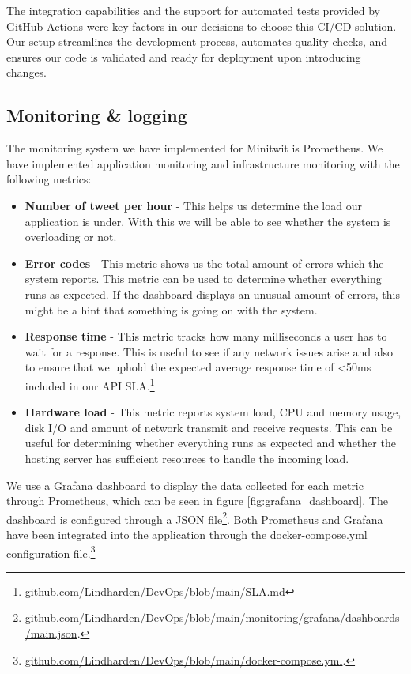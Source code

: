 The integration capabilities and the support for automated tests provided by GitHub Actions were key factors in our decisions to choose this CI/CD solution. Our setup streamlines the development process, automates quality checks, and ensures our code is validated and ready for deployment upon introducing changes.

\subsection{Monitoring \& logging}
The monitoring system we have implemented for Minitwit is Prometheus. We have implemented application monitoring and infrastructure monitoring with the following metrics:
\begin{itemize}
    \item \textbf{Number of tweet per hour} - This helps us determine the load our application is under. With this we will be able to see whether the system is overloading or not.
    \item \textbf{Error codes} - This metric shows us the total amount of errors which the system reports. This metric can be used to determine whether everything runs as expected. If the dashboard displays an unusual amount of errors, this might be a hint that something is going on with the system.
    \item \textbf{Response time} - This metric tracks how many milliseconds a user has to wait for a response. This is useful to see if any network issues arise and also to ensure that we uphold the expected average response time of <50ms included in our API SLA.\footnote{\href{https://github.com/Lindharden/DevOps/blob/main/SLA.md}{github.com/Lindharden/DevOps/blob/main/SLA.md}}
    \item \textbf{Hardware load} - This metric reports system load, CPU and memory usage, disk I/O and amount of network transmit and receive requests. This can be useful for determining whether everything runs as expected and whether the hosting server has sufficient resources to handle the incoming load.
\end{itemize}
We use a Grafana dashboard to display the data collected for each metric through Prometheus, which can be seen in figure \ref{fig:grafana_dashboard}. The dashboard is configured through a JSON file\footnote{\href{https://github.com/Lindharden/DevOps/blob/main/monitoring/grafana/dashboards/main.json}{github.com/Lindharden/DevOps/blob/main/monitoring/grafana/dashboards/main.json}.}. Both Prometheus and Grafana have been integrated into the application through the docker-compose.yml configuration file.\footnote{\href{https://github.com/Lindharden/DevOps/blob/main/docker-compose.yml}{github.com/Lindharden/DevOps/blob/main/docker-compose.yml}.}

